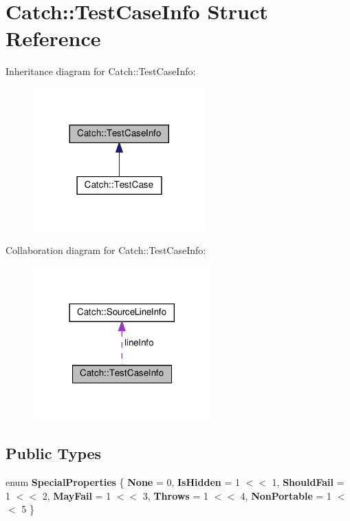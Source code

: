 \hypertarget{structCatch_1_1TestCaseInfo}{}\section{Catch\+:\+:Test\+Case\+Info Struct Reference}
\label{structCatch_1_1TestCaseInfo}


Inheritance diagram for Catch\+:\+:Test\+Case\+Info\+:\nopagebreak
\begin{figure}[H]
\begin{center}
\leavevmode
\includegraphics[width=188pt]{structCatch_1_1TestCaseInfo__inherit__graph}
\end{center}
\end{figure}


Collaboration diagram for Catch\+:\+:Test\+Case\+Info\+:\nopagebreak
\begin{figure}[H]
\begin{center}
\leavevmode
\includegraphics[width=194pt]{structCatch_1_1TestCaseInfo__coll__graph}
\end{center}
\end{figure}
\subsection*{Public Types}
\begin{DoxyCompactItemize}
\item 
\mbox{\label{structCatch_1_1TestCaseInfo_a39b232f74b4a7a6f2183b96759027eac}} 
enum {\bfseries Special\+Properties} \{ \newline
{\bfseries None} = 0, 
{\bfseries Is\+Hidden} = 1 $<$$<$ 1, 
{\bfseries Should\+Fail} = 1 $<$$<$ 2, 
{\bfseries May\+Fail} = 1 $<$$<$ 3, 
\newline
{\bfseries Throws} = 1 $<$$<$ 4, 
{\bfseries Non\+Portable} = 1 $<$$<$ 5
 \}
\end{DoxyCompactItemize}
